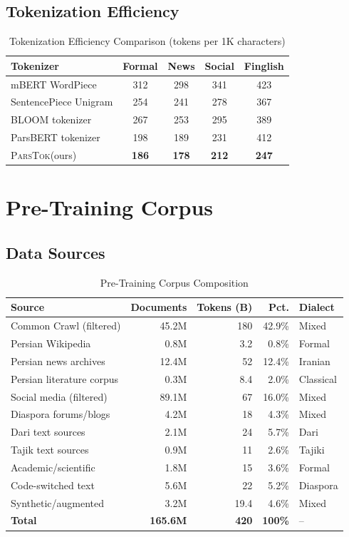 \documentclass[11pt,a4paper]{article}
\newcommand{\parstok}{\textsc{ParsTok}\xspace}
\begin{document}
\subsection{Tokenization Efficiency}

\begin{table}[H]
\centering
\caption{Tokenization Efficiency Comparison (tokens per 1K characters)}
\label{tab:tok-eff}
\begin{tabular}{lcccc}
\toprule
\textbf{Tokenizer} & \textbf{Formal} & \textbf{News} & \textbf{Social} & \textbf{Finglish} \\
\midrule
mBERT WordPiece & 312 & 298 & 341 & 423 \\
SentencePiece Unigram & 254 & 241 & 278 & 367 \\
BLOOM tokenizer & 267 & 253 & 295 & 389 \\
ParsBERT tokenizer & 198 & 189 & 231 & 412 \\
\parstok (ours) & \textbf{186} & \textbf{178} & \textbf{212} & \textbf{247} \\
\bottomrule
\end{tabular}
\end{table}

\section{Pre-Training Corpus}

\subsection{Data Sources}

\begin{table}[H]
\centering
\caption{Pre-Training Corpus Composition}
\label{tab:corpus}
\begin{tabular}{lrrrl}
\toprule
\textbf{Source} & \textbf{Documents} & \textbf{Tokens (B)} & \textbf{Pct.} & \textbf{Dialect} \\
\midrule
Common Crawl (filtered) & 45.2M & 180 & 42.9\% & Mixed \\
Persian Wikipedia & 0.8M & 3.2 & 0.8\% & Formal \\
Persian news archives & 12.4M & 52 & 12.4\% & Iranian \\
Persian literature corpus & 0.3M & 8.4 & 2.0\% & Classical \\
Social media (filtered) & 89.1M & 67 & 16.0\% & Mixed \\
Diaspora forums/blogs & 4.2M & 18 & 4.3\% & Mixed \\
Dari text sources & 2.1M & 24 & 5.7\% & Dari \\
Tajik text sources & 0.9M & 11 & 2.6\% & Tajiki \\
Academic/scientific & 1.8M & 15 & 3.6\% & Formal \\
Code-switched text & 5.6M & 22 & 5.2\% & Diaspora \\
Synthetic/augmented & 3.2M & 19.4 & 4.6\% & Mixed \\
\midrule
\textbf{Total} & \textbf{165.6M} & \textbf{420} & \textbf{100\%} & -- \\
\bottomrule
\end{tabular}
\end{table}
\end{document}
